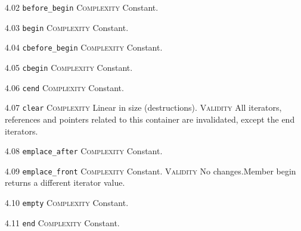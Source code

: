 \noindent\textcolor{cgreen}{4.02 \texttt{before\_begin}} \textsc{Complexity} Constant. \vspace{0.5em}

\noindent\textcolor{cgreen}{4.03 \texttt{begin}} \textsc{Complexity} Constant. \vspace{0.5em}

\noindent\textcolor{cgreen}{4.04 \texttt{cbefore\_begin}} \textsc{Complexity} Constant. \vspace{0.5em}

\noindent\textcolor{cgreen}{4.05 \texttt{cbegin}} \textsc{Complexity} Constant. \vspace{0.5em}

\noindent\textcolor{cgreen}{4.06 \texttt{cend}} \textsc{Complexity} Constant. \vspace{0.5em}

\noindent\textcolor{corange}{4.07 \texttt{clear}} \textsc{Complexity} Linear in size (destructions). \textsc{Validity} All iterators, references and pointers related to this container are invalidated, except the end iterators.\vspace{0.5em}

\noindent\textcolor{cgreen}{4.08 \texttt{emplace\_after}} \textsc{Complexity} Constant. \vspace{0.5em}

\noindent\textcolor{cgreen}{4.09 \texttt{emplace\_front}} \textsc{Complexity} Constant. \textsc{Validity} No changes.Member begin returns a different iterator value.\vspace{0.5em}

\noindent\textcolor{cgreen}{4.10 \texttt{empty}} \textsc{Complexity} Constant. \vspace{0.5em}

\noindent\textcolor{cgreen}{4.11 \texttt{end}} \textsc{Complexity} Constant. \vspace{0.5em}

